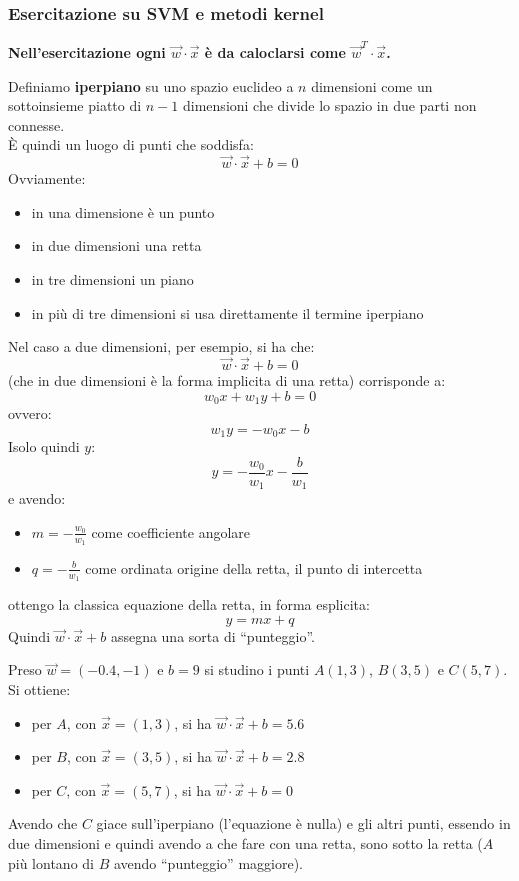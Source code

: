 \subsubsection{Esercitazione su SVM e metodi kernel}
\textbf{Nell'esercitazione ogni $\vec{w}\cdot\vec{x}$ è da caloclarsi come
  $\vec{w}^T\cdot\vec{x}$.} 
\begin{definizione}
  Definiamo \textbf{iperpiano} su uno spazio euclideo a $n$ dimensioni come un
  sottoinsieme piatto di $n-1$ dimensioni che divide lo spazio in due parti non
  connesse. \\
  È quindi un luogo di punti che soddisfa:
  \[\vec{w}\cdot\vec{x}+b=0\]
  Ovviamente:
  \begin{itemize}
    \item in una dimensione è un punto
    \item in due dimensioni una retta
    \item in tre dimensioni un piano
    \item in più di tre dimensioni si usa direttamente il termine iperpiano
  \end{itemize}
  Nel caso a due dimensioni, per esempio, si ha che:
  \[\vec{w}\cdot\vec{x}+b=0\]
  (che in due dimensioni è la forma implicita di una retta) corrisponde a:
  \[w_0x+w_1y+b=0\]
  ovvero:
  \[w_1y=-w_0x-b\]
  Isolo quindi $y$:
  \[y=-\frac{w_0}{w_1}x-\frac{b}{w_1}\]
  e avendo:
  \begin{itemize}
    \item $m=-\frac{w_0}{w_1}$ come coefficiente angolare
    \item $q=-\frac{b}{w_1}$ come ordinata origine della retta, il punto di
    intercetta 
  \end{itemize}
  ottengo la classica equazione della retta, in forma esplicita:
  \[y=mx+q\]
  Quindi $\vec{w}\cdot\vec{x}+b$ assegna una sorta di ``punteggio''.

\end{definizione}
\begin{esempio}
  Preso $\vec{w}=(-0.4,-1)$ e $b=9$ si studino i punti $A(1, 3)$, $B(3, 5)$ e
  $C(5, 7)$.\\
  Si ottiene:
  \begin{itemize}
    \item per $A$, con $\vec{x}=(1, 3)$, si ha $\vec{w}\cdot\vec{x}+b=5.6$
    \item per $B$, con $\vec{x}=(3, 5)$, si ha $\vec{w}\cdot\vec{x}+b=2.8$
    \item per $C$, con $\vec{x}=(5, 7)$, si ha $\vec{w}\cdot\vec{x}+b=0$
  \end{itemize}
  Avendo che $C$ giace sull'iperpiano (l'equazione è nulla) e gli altri punti,
  essendo in due dimensioni e quindi avendo a che fare con una retta, sono sotto
  la retta ($A$ più lontano di $B$ avendo ``punteggio'' maggiore).
\end{esempio}
